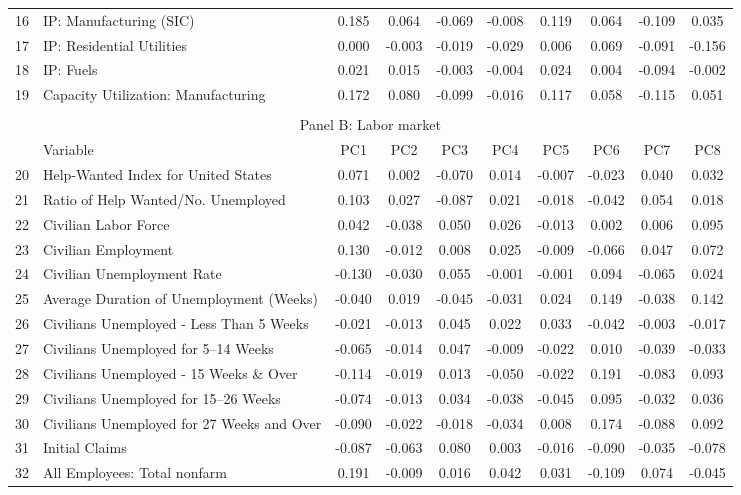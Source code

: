 \begin{table}[!h]
\begin{tabular}{llcccccccc}
16&IP: Manufacturing (SIC)	&	0.185	&	0.064	&	-0.069	&	-0.008	&	0.119	&	0.064	&	-0.109	&	0.035	\\
17&IP: Residential Utilities	&	0.000	&	-0.003	&	-0.019	&	-0.029	&	0.006	&	0.069	&	-0.091	&	-0.156	\\
18&IP: Fuels	&	0.021	&	0.015	&	-0.003	&	-0.004	&	0.024	&	0.004	&	-0.094	&	-0.002	\\
19&Capacity Utilization: Manufacturing	&	0.172	&	0.080	&	-0.099	&	-0.016	&	0.117	&	0.058	&	-0.115	&	0.051	\\
\\ \hline
 \multicolumn{10}{c}{Panel B: Labor market} \\ 
&Variable&	PC1	&	PC2	&	PC3	&	PC4	&	PC5	&	PC6	&	PC7	&	PC8	\\ \hline
20&Help-Wanted Index for United States	&	0.071	&	0.002	&	-0.070	&	0.014	&	-0.007	&	-0.023	&	0.040	&	0.032	\\
21&Ratio of Help Wanted/No. Unemployed	&	0.103	&	0.027	&	-0.087	&	0.021	&	-0.018	&	-0.042	&	0.054	&	0.018	\\
22&Civilian Labor Force	&	0.042	&	-0.038	&	0.050	&	0.026	&	-0.013	&	0.002	&	0.006	&	0.095	\\
23&Civilian Employment	&	0.130	&	-0.012	&	0.008	&	0.025	&	-0.009	&	-0.066	&	0.047	&	0.072	\\
24&Civilian Unemployment Rate	&	-0.130	&	-0.030	&	0.055	&	-0.001	&	-0.001	&	0.094	&	-0.065	&	0.024	\\
25&Average Duration of Unemployment (Weeks)	&	-0.040	&	0.019	&	-0.045	&	-0.031	&	0.024	&	0.149	&	-0.038	&	0.142	\\
26&Civilians Unemployed - Less Than 5 Weeks	&	-0.021	&	-0.013	&	0.045	&	0.022	&	0.033	&	-0.042	&	-0.003	&	-0.017	\\
27&Civilians Unemployed for 5–14 Weeks	&	-0.065	&	-0.014	&	0.047	&	-0.009	&	-0.022	&	0.010	&	-0.039	&	-0.033	\\
28&Civilians Unemployed - 15 Weeks \& Over	&	-0.114	&	-0.019	&	0.013	&	-0.050	&	-0.022	&	0.191	&	-0.083	&	0.093	\\
29&Civilians Unemployed for 15–26 Weeks	&	-0.074	&	-0.013	&	0.034	&	-0.038	&	-0.045	&	0.095	&	-0.032	&	0.036	\\
30&Civilians Unemployed for 27 Weeks and Over	&	-0.090	&	-0.022	&	-0.018	&	-0.034	&	0.008	&	0.174	&	-0.088	&	0.092	\\
31&Initial Claims	&	-0.087	&	-0.063	&	0.080	&	0.003	&	-0.016	&	-0.090	&	-0.035	&	-0.078	\\
32&All Employees: Total nonfarm	&	0.191	&	-0.009	&	0.016	&	0.042	&	0.031	&	-0.109	&	0.074	&	-0.045	\\

\end{tabular}
\end{table}
